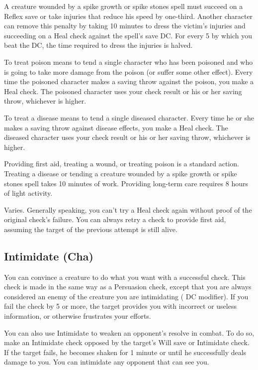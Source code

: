 A creature wounded by a spike growth or spike stones spell must succeed on a Reflex save or take injuries that reduce his speed by one-third. Another character can remove this penalty by taking 10 minutes to dress the victim's injuries and succeeding on a Heal check against the spell's save DC. For every 5 by which you beat the DC, the time required to dress the injuries is halved.

 To treat poison means to tend a single character who has been poisoned and who is going to take more damage from the poison (or suffer some other effect). Every time the poisoned character makes a saving throw against the poison, you make a Heal check. The poisoned character uses your check result or his or her saving throw, whichever is higher.

 To treat a disease means to tend a single diseased character. Every time he or she makes a saving throw against disease effects, you make a Heal check. The diseased character uses your check result or his or her saving throw, whichever is higher.

 Providing first aid, treating a wound, or treating poison is a standard action. Treating a disease or tending a creature wounded by a spike growth or spike stones spell takes 10 minutes of work. Providing long-term care requires 8 hours of light activity.

 Varies. Generally speaking, you can't try a Heal check again without proof of the original check's failure. You can always retry a check to provide first aid, assuming the target of the previous attempt is still alive.

\subsection{Intimidate (Cha)}
 You can convince a creature to do what you want with a successful check. This check is made in the same way as a Persuasion check, except that you are always considered an enemy of the creature you are intimidating ( DC modifier). If you fail the check by 5 or more, the target provides you with incorrect or useless information, or otherwise frustrates your efforts.

 You can also use Intimidate to weaken an opponent's resolve in combat. To do so, make an Intimidate check opposed by the target's Will save or Intimidate check. If the target fails, he becomes shaken for 1 minute or until he successfully deals damage to you. You can intimidate any opponent that can see you.

